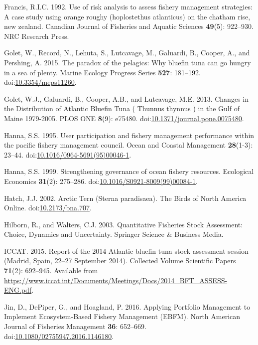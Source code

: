 \documentclass[]{article}
\begin{document}
\hypertarget{ref-francis1992use}{}
Francis, R.I.C. 1992. Use of risk analysis to assess fishery management
strategies: A case study using orange roughy (hoplostethus atlanticus)
on the chatham rise, new zealand. Canadian Journal of Fisheries and
Aquatic Sciences \textbf{49}(5): 922--930. NRC Research Press.

\hypertarget{ref-golet_paradox_2015}{}
Golet, W., Record, N., Lehuta, S., Lutcavage, M., Galuardi, B., Cooper,
A., and Pershing, A. 2015. The paradox of the pelagics: Why bluefin tuna
can go hungry in a sea of plenty. Marine Ecology Progress Series
\textbf{527}: 181--192.
doi:\href{https://doi.org/10.3354/meps11260}{10.3354/meps11260}.

\hypertarget{ref-golet_changes_2013}{}
Golet, W.J., Galuardi, B., Cooper, A.B., and Lutcavage, M.E. 2013.
Changes in the Distribution of Atlantic Bluefin Tuna ( Thunnus thynnus )
in the Gulf of Maine 1979-2005. PLOS ONE \textbf{8}(9): e75480.
doi:\href{https://doi.org/10.1371/journal.pone.0075480}{10.1371/journal.pone.0075480}.

\hypertarget{ref-Hanna1995UserCouncil}{}
Hanna, S.S. 1995. User participation and fishery management performance
within the pacific fishery management council. Ocean and Coastal
Management \textbf{28}(1-3): 23--44.
doi:\href{https://doi.org/10.1016/0964-5691(95)00046-1}{10.1016/0964-5691(95)00046-1}.

\hypertarget{ref-Hanna1999StrengtheningResources}{}
Hanna, S.S. 1999. Strengthening governance of ocean fishery resources.
Ecological Economics \textbf{31}(2): 275--286.
doi:\href{https://doi.org/10.1016/S0921-8009(99)00084-1}{10.1016/S0921-8009(99)00084-1}.

\hypertarget{ref-hatch_arctic_2002}{}
Hatch, J.J. 2002. Arctic Tern (Sterna paradisaea). The Birds of North
America Online.
doi:\href{https://doi.org/10.2173/bna.707}{10.2173/bna.707}.

\hypertarget{ref-hilborn_quantitative_2003}{}
Hilborn, R., and Walters, C.J. 2003. Quantitative Fisheries Stock
Assessment: Choice, Dynamics and Uncertainty. Springer Science \&
Business Media.

\hypertarget{ref-iccat_report_2015}{}
ICCAT. 2015. Report of the 2014 Atlantic bluefin tuna stock assessment
session (Madrid, Spain, 22--27 September 2014). Collected Volume
Scientific Papers \textbf{71}(2): 692--945. Available from
\url{https://www.iccat.int/Documents/Meetings/Docs/2014_BFT_ASSESS-ENG.pdf}.

\hypertarget{ref-Jin2016ApplyingEBFM}{}
Jin, D., DePiper, G., and Hoagland, P. 2016. Applying Portfolio
Management to Implement Ecosystem-Based Fishery Management (EBFM). North
American Journal of Fisheries Management \textbf{36}: 652--669.
doi:\href{https://doi.org/10.1080/02755947.2016.1146180}{10.1080/02755947.2016.1146180}.
\end{document}
